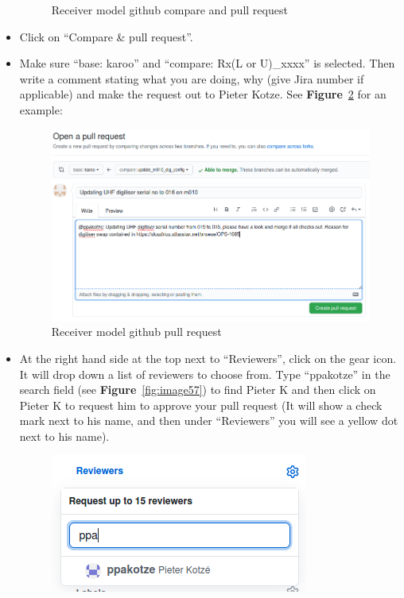 \begin{itemize}
\begin{figure}[!thb]
	\caption{Receiver model github compare and pull request}
	\label{fig:image108}
\end{figure}

\item Click on “Compare \& pull request”.
\item Make sure “base: karoo” and “compare: Rx(L or U)\_xxxx” is selected. Then write a comment stating what you are doing, why (give Jira number if applicable) and make the request out to Pieter Kotze. See \textbf{Figure}~\ref{fig:image81} for an example:

\begin{figure}[H]
	\centering
	\includegraphics[scale=0.4]{Chapters/images/image81.png}
	
	\caption{Receiver model github pull request}
	\label{fig:image81}
\end{figure}
\item At the right hand side at the top next to “Reviewers”, click on the gear icon. It will drop down a list of reviewers to choose from. Type “ppakotze” in the search field (see \textbf{Figure}~\ref{fig:image57}) to find Pieter K and then click on Pieter K to request him to approve your pull request (It will show a check mark next to his name, and then under “Reviewers” you will see a yellow dot next to his name).

\begin{figure}[!thb]
	\centering
	\includegraphics[scale=0.9]{Chapters/images/image57.png}
	

\end{figure}
\end{itemize}
